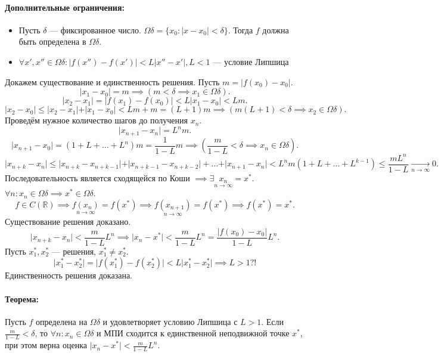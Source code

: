 \paragraph{Дополнительные ограничения:} \begin{itemize}
\item Пусть $\delta$ --- фиксированное число. $\Omega\delta = \{x_0: \vert x - x_0 \vert < \delta \}$. Тогда $f$ должна быть определена в $\Omega \delta$.
\item $\forall x', x'' \in \Omega\delta: \vert f(x'') - f(x') \vert < L\vert x'' - x' \vert, L < 1$ --- условие Липшица
\end{itemize}
Докажем существование и единственность решения.
Пусть $m = \vert f(x_0) - x_0 \vert$.
\[
	\vert x_1 - x_0\vert = m \implies (m < \delta \implies x_1 \in \Omega\delta).
\]
\[
	\vert x_2 - x_1\vert = \vert f(x_1) - f(x_0) \vert < L \vert x_1 - x_0 \vert < Lm.
\]
\[
	\vert x_2 - x_0\vert \leq \vert x_2 - x_1 \vert + \vert x_1 - x_0 \vert < Lm + m = (L + 1)m \implies (m(L+1) < \delta \implies x_2 \in \Omega\delta).
\]
Проведём нужное количество шагов до получения $x_n$.
\[
	\vert x_{n+1} - x_n \vert = L^n m.
\]
\[
	\vert x_{n+1} - x_0\vert = (1+L+\hdots+L^n)m = \frac{1}{1-L}m \implies (\frac{m}{1-L} < \delta \implies x_n \in \Omega \delta).
\]
\[
	\vert x_{n+k}-x_n\vert \leq \vert x_{n+k} - x_{n+k-1}\vert + \vert x_{n+k-1} - x_{n+k-2}\vert + \hdots + \vert x_{n+1} - x_n \vert < L^n m (1+L+\hdots+L^{k-1}) \leq \frac{mL^n}{1-L}
	\underset{n \to \infty}{\longrightarrow} 0.
\]
Последовательность является сходящейся по Коши $\implies \exists \underset{n \to \infty}{x_n} = x^*$.
$\forall n: x_n \in \Omega\delta \implies x^* \in \Omega\delta$.
\[
	f \in C(\mathbb{R}) \implies \underset{n\to\infty}{f(x_n)}=f(x^*)\implies\underset{n\to\infty}{f(x_{n+1})}=f(x^*)\implies f(x^*)=x^*.
\]
Существование решения доказано.
\[
	\vert x_{n+k} - x_n \vert < \frac{m}{1-L}L^n\implies \vert x_n - x^*\vert < \frac{m}{1-L}L^n = \frac{\vert f(x_0)-x_0\vert}{1-L}L^n.
\]
Пусть $x_1^*, x_2^*$ --- решения, $x_1^* \neq x_2^*$.
\[
	\vert x_1^* - x_2^* \vert = \vert f(x_1^*) - f(x_2^*)\vert < L\vert x_1^* - x_2^* \vert \implies L > 1 ?!
\]
Единственность решения доказана.
\paragraph{Теорема:} Пусть $f$ определена на $\Omega\delta$ и удовлетворяет условию Липшица с $L > 1$. Если $\frac{m}{1-L} < \delta$, то $\forall n: x_n \in \Omega \delta$ и МПИ сходится к единственной неподвижной точке $x^*$, при этом верна оценка $\vert x_n - x^*\vert < \frac {m}{1-L}L^n$.
